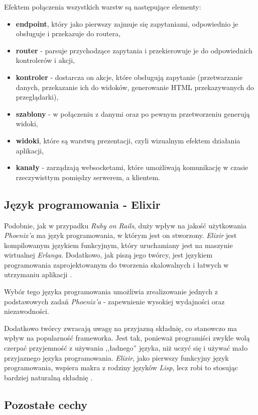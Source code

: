 \documentclass[mgr,oneside]{mgr}
\begin{document}
Efektem połączenia wszystkich warstw są następujące elementy:
\begin{itemize}
  \item \textbf{endpoint}, który jako pierwszy zajmuje się zapytaniami, odpowiednio je obsługuje i przekazuje do routera,
  \item \textbf{router} - parsuje przychodzące zapytania i przekierowuje je do odpowiednich kontrolerów i akcji,
  \item \textbf{kontroler} - dostarcza on akcje, które obsługują zapytanie (przetwarzanie danych, przekazanie ich do widoków, generowanie HTML przekazywanych do przeglądarki),
  \item \textbf{szablony} - w połączeniu z danymi oraz po pewnym przetworzeniu generują widoki,
  \item \textbf{widoki}, które są warstwą prezentacji, czyli wizualnym efektem działania aplikacji,
  \item \textbf{kanały} - zarządzają websocketami, które umożliwają komunikację w czasie rzeczywisttym pomiędzy serwerem, a klientem.
\end{itemize}

\subsection{Język programowania - Elixir} %
\label{phoenix:elixir}
Podobnie, jak w przypadku \textit{Ruby on Rails}, duży wpływ na jakość użytkowania \textit{Phoenix'a} ma język programowania, w którym jest on stworzony. \textit{Elixir} jest kompilowanym językiem funkcyjnym, który uruchamiany jest na maszynie wirtualnej \textit{Erlanga}. Dodatkowo, jak piszą jego twórcy, jest językiem programowania zaprojektowanym do tworzenia skalowalnych i łatwych w utrzymaniu aplikacji \cite{elixir}.

Wybór tego języka programowania umożliwia zrealizowanie jednych z podstawowych zadań \textit{Phoenix'a} - zapewnienie wysokiej wydajności oraz niezawodności.

Dodatkowo twórcy zwracają uwagę na przyjazną składnię, co stanowczo ma wpływ na popularność frameworka. Jest tak, ponieważ programiści zwykle wolą czerpać przyjemność z używania ,,ładnego'' języka, niż uczyć się i używać mało przyjaznego języka programowania. \textit{Elixir}, jako pierwszy funkcyjny język programowania, wspiera makra z rodziny języków \textit{Lisp}, lecz robi to stosując bardziej naturalną składnię \cite{phoenix_doctrine}.

\subsection{Pozostałe cechy}
\end{document}
